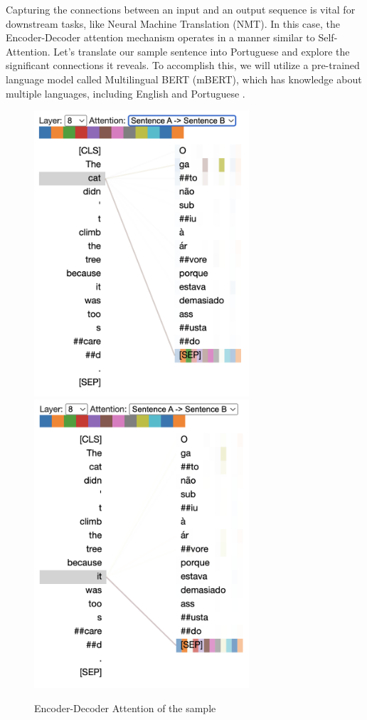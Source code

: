 Capturing the connections between an input and an output sequence is vital for downstream tasks, like Neural Machine Translation (NMT). In this case, the Encoder-Decoder attention mechanism operates in a manner similar to Self-Attention. Let's translate our sample sentence into Portuguese and explore the significant connections it reveals. To accomplish this, we will utilize a pre-trained language model called Multilingual BERT (mBERT), which has knowledge about multiple languages, including English and Portuguese \cite{devlin2018bert}.


\begin{figure}[h]
    \centering
    \includegraphics[width=8cm]{pages/imgs/att_cat_sample.png}
    \includegraphics[width=8cm]{pages/imgs/att_it_sample.png}
    \caption{Encoder-Decoder Attention of the sample}
    \label{fig:ed_att_sample}
\end{figure}

